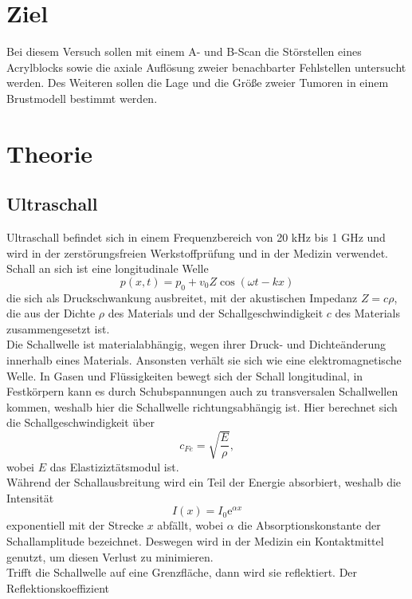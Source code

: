 \section{Ziel}
Bei diesem Versuch sollen mit einem A- und B-Scan die Störstellen eines Acrylblocks sowie die axiale Auflösung zweier benachbarter Fehlstellen untersucht werden. Des Weiteren sollen die Lage und die Größe zweier Tumoren in einem Brustmodell bestimmt werden. 

\section{Theorie}
\label{sec:Theorie}
\subsection{Ultraschall}
Ultraschall befindet sich in einem Frequenzbereich von 20 kHz bis 1 GHz und wird in der zerstörungsfreien Werkstoffprüfung und in der Medizin verwendet. Schall an sich ist eine longitudinale Welle
\begin{equation*}
  p(x,t)=p_0+v_0 Z \cos(\omega t-kx)
\end{equation*}
die sich als Druckschwankung ausbreitet, mit der akustischen Impedanz $Z=c\rho$, die aus der Dichte $\rho$ des Materials und der Schallgeschwindigkeit $c$ des Materials zusammengesetzt ist. \\
\noindent Die Schallwelle ist materialabhängig, wegen ihrer Druck- und Dichteänderung innerhalb eines Materials. Ansonsten verhält sie sich wie eine elektromagnetische Welle. In Gasen und Flüssigkeiten bewegt sich der Schall longitudinal, in Festkörpern kann es durch Schubspannungen auch zu transversalen Schallwellen kommen, weshalb hier die Schallwelle richtungsabhängig ist. Hier berechnet sich die Schallgeschwindigkeit über
\begin{equation*}
  c_{Fe}=\sqrt{\frac{E}{\rho}},
\end{equation*}
wobei $E$ das Elastiziztätsmodul ist.\\
Während der Schallausbreitung wird ein Teil der Energie absorbiert, weshalb die Intensität
\begin{equation*}
  I(x)=I_0 \textrm{e}^{\alpha x}
\end{equation*} 
exponentiell mit der Strecke $x$ abfällt, wobei $\alpha$ die Absorptionskonstante der Schallamplitude bezeichnet. Deswegen wird in der Medizin ein Kontaktmittel genutzt, um diesen Verlust zu minimieren.\\
Trifft die Schallwelle auf eine Grenzfläche, dann wird sie reflektiert. Der Reflektionskoeffizient
